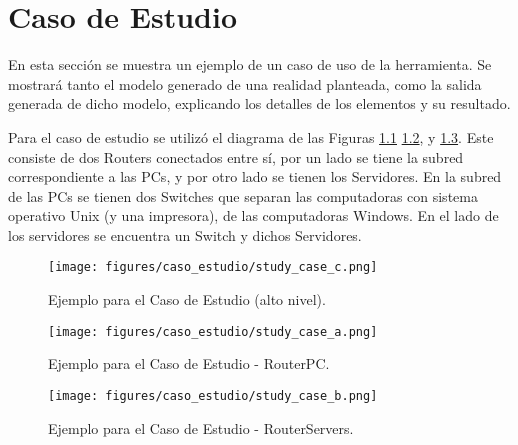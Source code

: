 \chapter{Caso de Estudio} \label{Caso de Estudio}
En esta sección se muestra un ejemplo de un caso de uso de la herramienta. Se mostrará tanto el modelo generado de una realidad planteada, como la salida generada de dicho modelo, explicando los detalles de los elementos y su resultado.

Para el caso de estudio se utilizó el diagrama de las Figuras  \ref{fig:caso_estudio} \ref{fig:caso_estudio_pc}, y \ref{fig:caso_estudio_servers}. Este consiste de dos Routers conectados entre sí, por un lado se tiene la subred correspondiente a las PCs, y por otro lado se tienen los Servidores. En la subred de las PCs se tienen dos Switches que separan las computadoras con sistema operativo Unix (y una impresora), de las computadoras Windows. En el lado de los servidores se encuentra un Switch y dichos Servidores.

\begin{figure}[htbp]
    \centering
    \texttt{[image: figures/caso\_estudio/study\_case\_c.png]}
    \caption{Ejemplo para el Caso de Estudio (alto nivel).}
    \label{fig:caso_estudio}
\end{figure}

\begin{figure}[htbp]
    \centering
    \texttt{[image: figures/caso\_estudio/study\_case\_a.png]}
    \caption{Ejemplo para el Caso de Estudio - RouterPC.}
    \label{fig:caso_estudio_pc}
\end{figure}

\begin{figure}[htbp]
    \centering
    \texttt{[image: figures/caso\_estudio/study\_case\_b.png]}
    \caption{Ejemplo para el Caso de Estudio - RouterServers.}
    \label{fig:caso_estudio_servers}
\end{figure}

